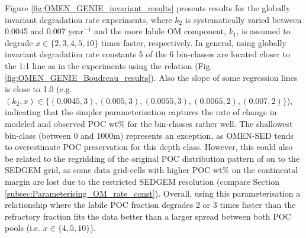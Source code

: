 \documentclass[gmd, manuscript]{copernicus}
\begin{document}
Figure \ref{fig:OMEN_GENIE_invariant_results} presents results for the globally invariant degradation rate experiments, where $k_2$ is systematically varied between 0.0045 and 0.007 year$^{-1}$ and 
the more labile OM component, $k_1$, is assumed to degrade $x \in \{2, 3, 4, 5, 10\}$ times faster, respectively. 
In general, using globally invariant degradation rate constants 5 of the 6 bin-classes are located closer to the 1:1 line as in the experiments using the \citet{boudreau1997diagenetic} relation (Fig. \ref{fig:OMEN_GENIE_Boudreau_results}). 
Also the slope of some regression lines is close to 1.0 
(e.g. $(k_2, x) \in \{ (0.0045, 3),  (0.005, 3), (0.0055, 3), (0.0065, 2), (0.007, 2)\}$), indicating that the simpler parameterisation captures the rate of change in modeled and observed POC wt\% for the bin-classes rather well. 
The shallowest bin-class (between 0 and 1000m) represents an exception, as OMEN-SED tends to overestimate POC preservation for this depth class. However, this could also be related to the regridding of the original POC distribution 
pattern of \citep{seiter_organic_2004} on to the SEDGEM grid, as some data grid-cells with higher POC wt\% on the continental margin are lost due to the restricted SEDGEM resolution (compare Section \ref{subsec:Parameterising_OM_rate_const}). 
Overall, using this parameterisation a relationship where the labile POC fraction degrades 2 or 3 times faster than the refractory fraction fits the 
\citet{seiter_organic_2004} data better than a larger spread between both POC pools (i.e. $x \in \{4, 5, 10\}$).
\end{document}
